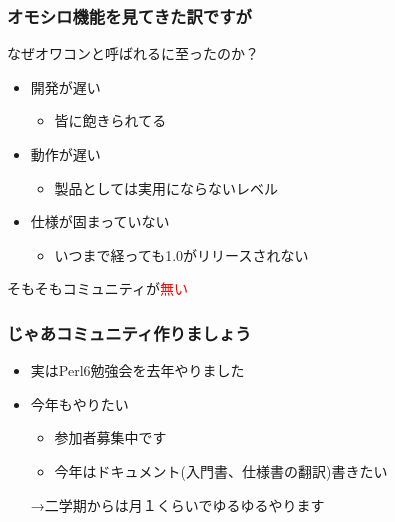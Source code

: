 \documentclass[14pt,dvipdfm,trans]{beamer}
\begin{document}
\begin{frame}
 \frametitle{オモシロ機能を見てきた訳ですが}
なぜオワコンと呼ばれるに至ったのか？

\begin{itemize}
 \item 開発が遅い
 \begin{itemize}
  \item 皆に飽きられてる
 \end{itemize}
 \item 動作が遅い
       \begin{itemize}
	\item 製品としては実用にならないレベル
       \end{itemize}
 \item 仕様が固まっていない
       \begin{itemize}
	\item いつまで経っても1.0がリリースされない
       \end{itemize}
\end{itemize}

\vspace*{1zh}
\begin{center}
{\Large{そもそもコミュニティが\textcolor{red}{無い}}}
\end{center}
\end{frame}

\begin{frame}
 \frametitle{じゃあコミュニティ作りましょう}
\begin{itemize}
 \item 実はPerl6勉強会を去年やりました
 \item 今年もやりたい
 \begin{itemize}
  \item 参加者募集中です
  \item 今年はドキュメント(入門書、仕様書の翻訳)書きたい
 \end{itemize}
\vspace*{1zh}
→二学期からは月１くらいでゆるゆるやります
\end{itemize}

\end{frame}

\end{document}
